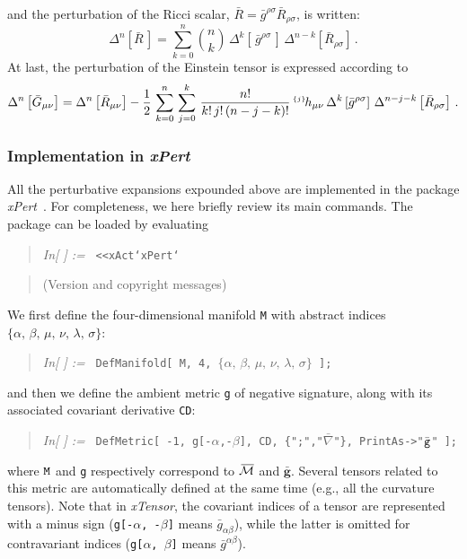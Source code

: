 \documentclass[notitlepage,onecolumn,floatfix,preprintnumbers,aps,prd,showpacs,nofootinbib,amsmath,amssymb,amsfonts]{revtex4-1}
\newcommand{\be}{\begin{equation}}
\newcommand{\ee}{\end{equation}}
\newcommand{\<}{\langle}
\renewcommand{\>}{\rangle}
\newcounter{inout}
\newcommand{\inoutput}{%
	\stepcounter{inout}%
	\theinout}
\newcommand{\xPert}{{\em \lowercase{x}P\lowercase{ert}}}
\newcommand{\pert}[2]{{}^{\mbox{\,\tiny $\{#1\}\!$}}{#2}}
\newcommand{\mathIn}[1]{
	\begin{quotation} {\em In[\inoutput] :=\ } {\tt #1} \end{quotation}}
\newcommand{\mathComment}[1]{
	\begin{quotation} \qquad \qquad #1 \end{quotation}}
\begin{document}
and the perturbation of the Ricci scalar, $\bar R = \bar g^{\rho \sigma} \bar R_{\rho \sigma}$, is written: 
\be
	\Delta^{n} \left[ \bar R \, \right] 
		= \sum_{k=0}^n \binom{n}{k} \, \Delta^{k} \left[ \, \bar g^{\rho \sigma} \, \right] \, 
		\Delta^{n-k} \left[ \bar R_{\rho \sigma} \right] \, . 
\ee
At last, the perturbation of the Einstein tensor is expressed according to 
\be
	\Delta^{n} \left[ \bar G_{\mu \nu} \right] 
		= \Delta^{n} \left[ \bar R_{\mu \nu} \right] 
		- \frac{1}{2} \, \sum_{k=0}^{n} \, \sum_{j=0}^{k} \, \frac{n!}{k! \, j! \, (n-j-k)!} 
		\pert{j}{h_{\mu \nu}} \, \Delta^k \left[ \bar
                  g^{\rho \sigma} \right] \, \Delta^{n-j-k} \left[
                  \bar R_{\rho \sigma} \right] \, . 
\ee

\subsubsection{Implementation in \xPert}

All the perturbative expansions expounded above are implemented in the package \xPert~\cite{Brizuela:2008ra}. 
For completeness, we here briefly review its main commands. 
The package can be loaded by evaluating 
%
\mathIn{<<xAct`xPert`}
\mathComment{(Version and copyright messages)}
%
We first define the four-dimensional manifold {\tt M} with abstract indices $\{ \alpha, \, \beta, \, \mu, \, \nu, \, \lambda, \, \sigma \}$: 
%
\mathIn{DefManifold[ M, 4, $\{ \alpha, \, \beta, \, \mu, \, \nu, \, \lambda, \, \sigma \}$ ];}
%
and then we define the ambient metric {\tt g} of negative signature, along with its associated covariant derivative {\tt CD}:
%
\mathIn{DefMetric[ -1, g[-$\alpha$,-$\beta$], CD, \{";","$\bar{\nabla}$"\}, PrintAs->"$\bar {\tt g}$" ];}
%
where ${\tt M}$ and {\tt g} respectively correspond to $\, \overline{\! \cal M}$ and $\bm{\bar g}$. 
Several tensors related to this metric are automatically defined at the same time (e.g., all the curvature tensors). 
Note that in \textit{xTensor}, the covariant indices of a tensor are represented with a minus sign ({\tt g[-$\alpha$, \!\!-$\beta$]} 
means $\bar g_{\alpha \beta}$), while the latter is omitted for contravariant indices ({\tt g[$\alpha$, \!\!$\beta$]} means $\bar g^{\alpha \beta}$). 
\end{document}
